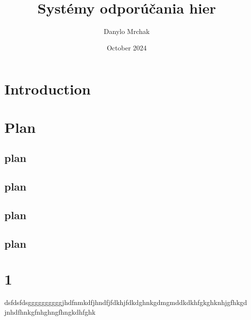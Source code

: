 \documentclass{article}
\title{Systémy odporúčania hier}
\author{Danylo Mrchak}
\date{October 2024}
\begin{document}
\maketitle

\section{Introduction}
\section{Plan}
\subsection{plan}
\subsection{plan}
\subsection{plan}
\subsection{plan}

\section{1}
dsfdsfdsggggggggggjhdfnmkdfjhndfjfdkhjfdkdghnkgdmgmddkdkhfgkghknhjgfhkgdjnhdfhnkgfnhghngfhngkdhfghk
\end{document}
